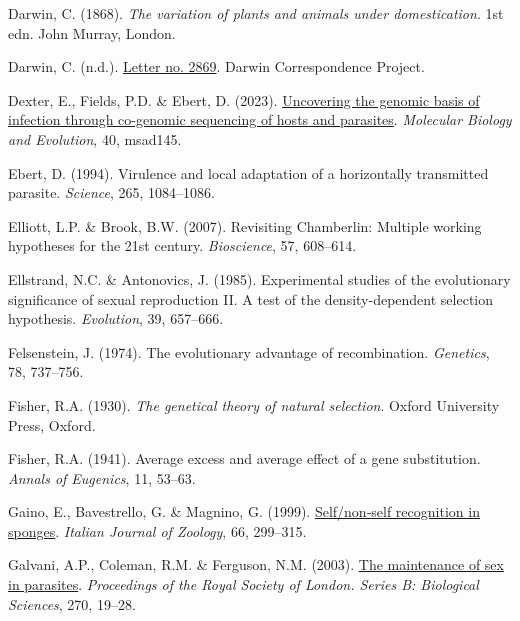 \documentclass[
  letterpaper,
]{book}
\newlength{\cslhangindent}
\newenvironment{CSLReferences}[2] %
 {\begin{list}{}{%
  \setlength{\itemindent}{0pt}
  \setlength{\leftmargin}{0pt}
  \setlength{\parsep}{0pt}
  \ifodd #1
   \setlength{\leftmargin}{\cslhangindent}
   \setlength{\itemindent}{-1\cslhangindent}
  \fi
  \setlength{\itemsep}{#2\baselineskip}}}
 {\end{list}}
\begin{document}
\begin{CSLReferences}{1}{0}
Darwin, C. (1868). \emph{The variation of plants and animals under
domestication}. 1st edn. John Murray, London.

Darwin, C. (n.d.).
\href{https://www.darwinproject.ac.uk/letter/?docId=letters/DCP-LETT-2869.xml}{Letter
no. 2869}. Darwin Correspondence Project.

Dexter, E., Fields, P.D. \& Ebert, D. (2023).
\href{https://doi.org/10.1093/molbev/msad145}{Uncovering the genomic
basis of infection through co-genomic sequencing of hosts and
parasites}. \emph{Molecular Biology and Evolution}, 40, msad145.

Ebert, D. (1994). Virulence and local adaptation of a horizontally
transmitted parasite. \emph{Science}, 265, 1084--1086.

Elliott, L.P. \& Brook, B.W. (2007). Revisiting {C}hamberlin: Multiple
working hypotheses for the 21st century. \emph{Bioscience}, 57,
608--614.

Ellstrand, N.C. \& Antonovics, J. (1985). Experimental studies of the
evolutionary significance of sexual reproduction II. A test of the
density-dependent selection hypothesis. \emph{Evolution}, 39, 657--666.

Felsenstein, J. (1974). The evolutionary advantage of recombination.
\emph{Genetics}, 78, 737--756.

Fisher, R.A. (1930). \emph{The genetical theory of natural selection}.
Oxford University Press, Oxford.

Fisher, R.A. (1941). Average excess and average effect of a gene
substitution. \emph{Annals of Eugenics}, 11, 53--63.

Gaino, E., Bavestrello, G. \& Magnino, G. (1999).
\href{https://doi.org/10.1080/11250009909356270}{Self/non‐self
recognition in sponges}. \emph{Italian Journal of Zoology}, 66,
299--315.

Galvani, A.P., Coleman, R.M. \& Ferguson, N.M. (2003).
\href{https://doi.org/10.1098/rspb.2002.2182}{The maintenance of sex in
parasites}. \emph{Proceedings of the Royal Society of London. Series B:
Biological Sciences}, 270, 19--28.


\end{CSLReferences}
\end{document}
